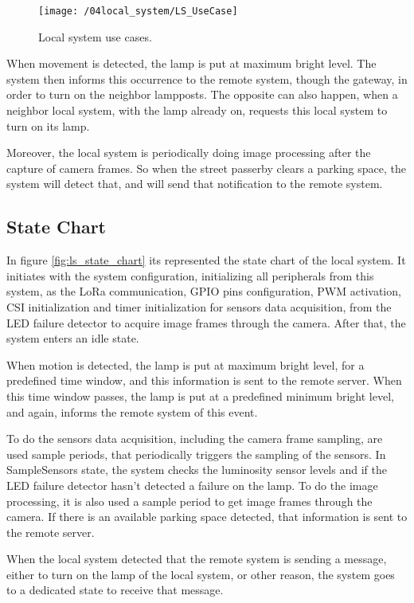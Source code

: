 \begin{figure}[ht] 
	\centering
	\texttt{[image: /04local\_system/LS\_UseCase]}
	\caption{Local system use cases.}
	\label{fig:ls_use_cases}
\end{figure}

When movement is detected, the lamp is put at maximum bright level. The system then informs this occurrence to the remote system, though the gateway, in order to turn on the neighbor lampposts. The opposite can also happen, when a neighbor local system, with the lamp already on, requests this local system to turn on its lamp. 

Moreover, the local system is periodically doing image processing after the capture of camera frames. So when the street passerby clears a parking space, the system will detect that, and will send that notification to the remote system.

\clearpage
\subsection{State Chart}
In figure \ref{fig:ls_state_chart} its represented the state chart of the local system. It initiates with the system configuration, initializing all peripherals from this system, as the LoRa communication, GPIO pins configuration, PWM activation, CSI initialization and timer initialization for sensors data acquisition, from the LED failure detector to acquire image frames through the camera. After that, the system enters an idle state.

When motion is detected, the lamp is put at maximum bright level, for a predefined time window, and this information is sent to the remote server. When this time window passes, the lamp is put at a predefined minimum bright level, and again, informs the remote system of this event.

To do the sensors data acquisition, including the camera frame sampling, are used sample periods, that periodically triggers the sampling of the sensors. In SampleSensors state, the system checks the luminosity sensor levels and if the LED failure detector hasn't detected a failure on the lamp. To do the image processing, it is also used a sample period to get image frames through the camera. If there is an available parking space detected, that information is sent to the remote server.

When the local system detected that the remote system is sending a message, either to turn on the lamp of the local system, or other reason, the system goes to a dedicated state to receive that message.

